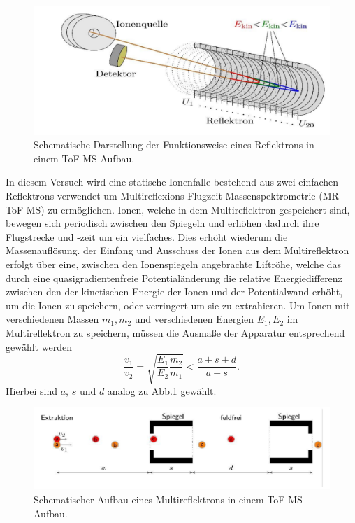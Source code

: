 \documentclass[numbers=noenddot,a4paper,notitlepage,twoside,BCOR15mm]{scrartcl}
\begin{document}
		\begin{figure}[!h]
			\centering
			\includegraphics[width=0.8\columnwidth]{pics/Reflektron}
			\caption{Schematische Darstellung der Funktionsweise eines Reflektrons in einem ToF-MS-Aufbau.}
		\end{figure}
		In diesem Versuch wird eine statische Ionenfalle bestehend aus zwei einfachen Reflektrons verwendet um Multireflexions-Flugzeit-Massenspektrometrie (MR-ToF-MS) zu ermöglichen. Ionen, welche in dem Multireflektron gespeichert sind, bewegen sich periodisch zwischen den Spiegeln und erhöhen dadurch ihre Flugstrecke und -zeit um ein vielfaches. Dies erhöht wiederum die Massenauflösung. der Einfang und Ausschuss der Ionen aus dem Multireflektron erfolgt über eine, zwischen den Ionenspiegeln angebrachte Liftröhe, welche das durch eine quasigradientenfreie Potentialänderung die relative Energiedifferenz zwischen den der kinetischen Energie der Ionen und der Potentialwand erhöht, um die Ionen zu speichern, oder verringert um sie zu extrahieren. Um Ionen mit verschiedenen Massen $m_1, m_2$ und verschiedenen Energien $E_1, E_2$ im Multireflektron zu speichern, müssen die Ausmaße der Apparatur entsprechend gewählt werden
		\begin{equation}
			\frac{v_1}{v_2} = \sqrt{\frac{E_1}{E_2}\frac{m_2}{m_1}}< \frac{a+s+d}{a+s}.
		\end{equation}
		Hierbei sind $a$, $s$ und $d$ analog zu Abb.\ref{abb:multiref} gewählt.
		
		\begin{figure}[h]
			\centering
			\includegraphics[width=1\columnwidth]{pics/Multireflektron}
			\caption{Schematischer Aufbau eines Multireflektrons in einem ToF-MS-Aufbau.}
			\label{abb:multiref}
		\end{figure}
\end{document}
